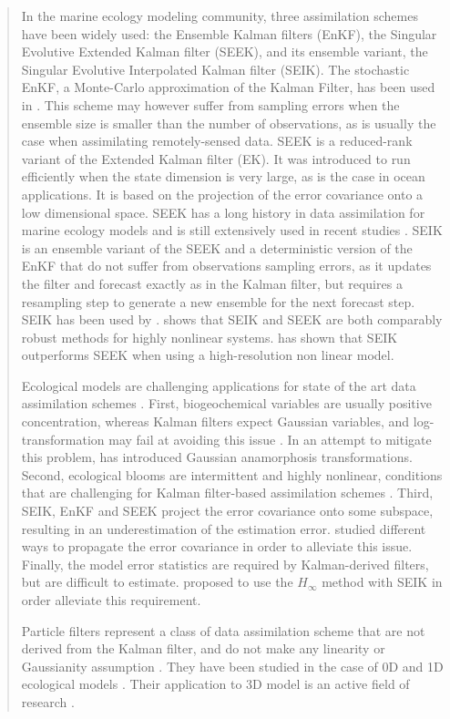 \begin{quotation}
In the marine ecology modeling community, three assimilation schemes have been
widely used: the Ensemble Kalman filters (EnKF), the Singular Evolutive
Extended Kalman filter (SEEK), and its ensemble variant, the Singular Evolutive
Interpolated Kalman filter (SEIK). The stochastic EnKF, a Monte-Carlo
approximation of the Kalman Filter, has been used in \citet{Ciavatta2011,
Ciavatta2014}. This scheme may however suffer from sampling errors when the
ensemble size is smaller than the number of observations, as is usually the
case when assimilating remotely-sensed data. SEEK is a reduced-rank variant of
the Extended Kalman filter (EK). It was introduced to run efficiently when the
state dimension is very large, as is the case in ocean applications. It is
based  on the projection of the error covariance onto a low dimensional space.
SEEK has a long history in data assimilation for marine ecology models and is
still extensively used in recent studies \citep{Fontana2013, Korres2012,
Butenschon2012}.  SEIK is an ensemble variant of the SEEK  and a deterministic
version of the EnKF that do not suffer from observations sampling errors, as it
updates the filter and forecast exactly as in the Kalman filter, but requires a
resampling step to generate a new ensemble for the next forecast step. SEIK has
been used by \citep{Triantafyllou2013, Korres2012}. \citet{Korres2012} shows
that SEIK and SEEK are both comparably robust methods for highly nonlinear
systems. \citet{Hoteit2005} has shown that SEIK outperforms SEEK when using a
high-resolution non linear model.

Ecological models are challenging applications for state of the art data
assimilation schemes \citep{Edwards2015}. First, biogeochemical variables are
usually positive concentration, whereas Kalman filters expect Gaussian
variables, and log-transformation may fail at avoiding this issue
\citep{Ciavatta2011}. In an attempt to mitigate this problem,
\citet{Fontana2013} has introduced Gaussian anamorphosis transformations.
Second, ecological blooms are intermittent and highly nonlinear, conditions
that are challenging for Kalman filter-based assimilation schemes
\citep{Triantafyllou2013, Korres2012}. Third, SEIK, EnKF and SEEK project the
error covariance onto some subspace, resulting in an underestimation of the
estimation error. \citet{Butenschon2012} studied different ways to propagate
the error covariance in order to alleviate this issue. Finally, the model error
statistics are required by Kalman-derived filters, but are difficult to
estimate. \citet{Triantafyllou2013} proposed to use the $H_\infty$ method with
SEIK in order alleviate this requirement.

Particle filters represent a class of data assimilation scheme that are not
derived from the Kalman filter, and do not make any linearity or Gaussianity
assumption \citep{Edwards2015}. They have been studied in the case of 0D and 1D
ecological models \citep{Edwards2015}.  Their application to 3D model is an
active field of research \citep{Edwards2015}.

\end{quotation}

